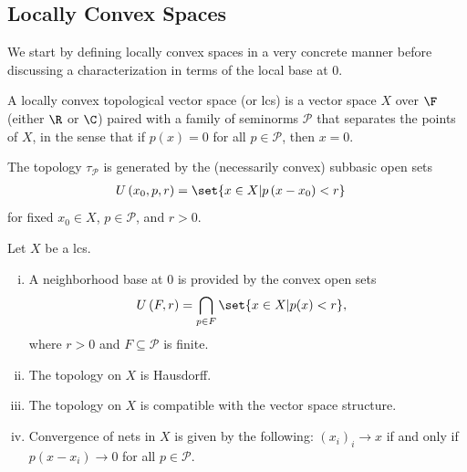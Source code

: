 \documentclass[10pt]{mypackage}
\begin{document}
\subsection{Locally Convex Spaces}%
We start by defining locally convex spaces in a very concrete manner before discussing a characterization in terms of the local base at $0$.
\begin{definition}
  A locally convex topological vector space (or lcs) is a vector space $X$ over $\F$ (either $\R$ or $\C$) paired with a family of seminorms $ \mathcal{P} $ that separates the points of $X$, in the sense that if $p(x) = 0$ for all $p\in \mathcal{P}$, then $x = 0$.

  The topology $\tau_{\mathcal{P}}$ is generated by the (necessarily convex) subbasic open sets
  \begin{align*}
    U\left( x_0,p,r \right) &= \set{x\in X | p\left( x-x_0 \right) < r}
  \end{align*}
  for fixed $x_0\in X$, $p\in \mathcal{P}$, and $r > 0$.
\end{definition}
\begin{theorem}
  Let $X$ be a lcs.
  \begin{enumerate}[(i)]
    \item A neighborhood base at $0$ is provided by the convex open sets
      \begin{align*}
        U\left( F,r \right) &= \bigcap_{p\in F} \set{x\in X | p(x) < r},
      \end{align*}
      where $r > 0$ and $F\subseteq \mathcal{P}$ is finite.
    \item The topology on $X$ is Hausdorff.
    \item The topology on $X$ is compatible with the vector space structure.
    \item Convergence of nets in $X$ is given by the following: $\left( x_i \right)_i\rightarrow x$ if and only if $p\left( x-x_i \right)\rightarrow 0$ for all $p\in \mathcal{P}$.
  \end{enumerate}
\end{theorem}
\end{document}

